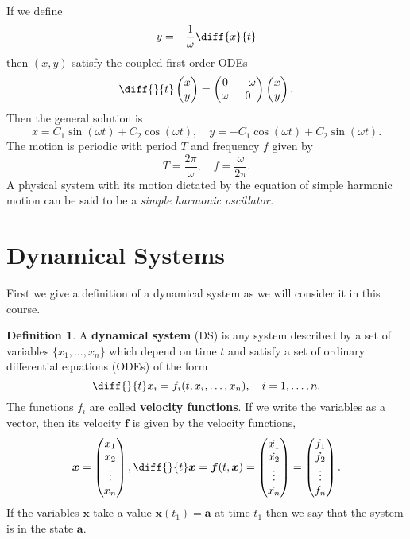 \documentclass[12pt, a4paper]{article}
\newcommand{\f}[2]{\frac{#1}{#2}}
\theoremstyle{definition}
\newtheorem{definition}{Definition}[section]
\theoremstyle{plain}
\begin{document}
If we define $$y=-\frac{1}{\omega}\diff{x}{t}$$ then $(x,y)$ satisfy the coupled first order ODEs $$\diff{}{t}\begin{pmatrix} x\\y \end{pmatrix}=\begin{pmatrix} 0&-\omega\\ \omega & 0 \end{pmatrix}\begin{pmatrix} x\\y \end{pmatrix}.$$ Then the general solution is $$x=C_1\sin(\omega t)+C_2\cos(\omega t), \quad y=-C_1\cos(\omega t)+C_2\sin(\omega t).$$ The motion is periodic with period $T$ and frequency $f$ given by $$T=\frac{2\pi}{\omega}, \quad f=\frac{\omega}{2\pi}.$$ A physical system with its motion dictated by the equation of simple harmonic motion can be said to be a \textit{simple harmonic oscillator.}

\section{Dynamical Systems}

First we give a definition of a dynamical system as we will consider it in this course.

\begin{definition}
A \textbf{dynamical system} (DS) is any system described by a set of variables $\{x_1,\ldots, x_n\}$ which depend on time $t$ and satisfy a set of ordinary differential equations (ODEs) of the form $$\diff{}{t}x_i=f_i(t,x_i,\ldots,x_n), \quad i = 1,\ldots,n.$$ The functions $f_i$ are called \textbf{velocity functions}. If we write the variables as a vector, then its velocity $\bm{f}$ is given by the velocity functions, $$\bm{x} = \begin{pmatrix} x_1 \\x_2\\\vdots\\x_n \end{pmatrix}, \diff{}{t}\bm{x} = \bm{f}(t,\bm{x})= \begin{pmatrix} \dot{x_1}\\\dot{x_2}\\\vdots\\\dot{x_n} \end{pmatrix} =\begin{pmatrix} f_1 \\f_2\\\vdots \\ f_n \end{pmatrix}.$$ If the variables $\bm{x}$ take a value $\bm{x}(t_1) = \bm{a}$ at time $t_1$ then we say that the system is in the state $\bm{a}$. 
\end{definition} 
\end{document}
